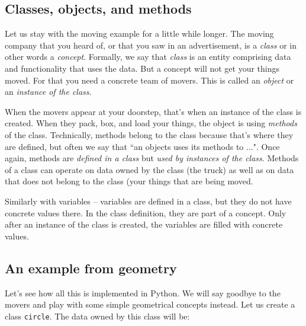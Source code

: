 \subsection{Classes, objects, and methods}

Let us stay with the moving example for a little while longer. The moving 
company that you heard of, or that you saw in an advertisement, 
is a {\em class} or in other words a {\em concept}. Formally, we say that 
{\em class} is an entity comprising data and functionality that uses the data.
But a concept will not get your things moved. For that you need a concrete team of 
movers. This is called an {\em object} or an {\em instance of the class}. 

When the movers appear at your doorstep, that's when an instance 
of the class is created. When they pack, box, and load your things, the object is using 
{\em methods} of the class. Technically, methods belong to the class because that's
where they are defined, but often we say that ``an objects uses its methods to ...". 
Once again, methods are {\em defined in a class} but {\em used 
by instances of the class}. 
Methods of a class can operate on data owned by the class (the truck) as well as 
on data that does not belong to the class (your things that are being moved.

Similarly with variables -- variables are defined in a class, but they do not 
have concrete values there. In the class definition, they are part of a concept. 
Only after an instance of the class is created, the variables are filled with 
concrete values. 

\subsection{An example from geometry}

Let's see how all this is implemented in Python. We will say goodbye to the movers
and play with some simple geometrical concepts instead. Let us create a class
{\tt circle}. The data owned by this class will be:

